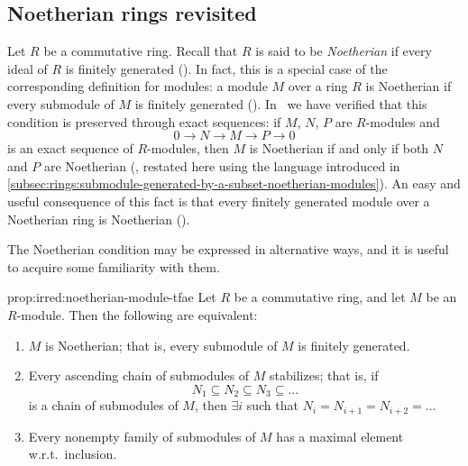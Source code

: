 \subsection{Noetherian rings revisited}
\label{subsec:irred:noetherian-rings-revisited}

Let $R$ be a commutative ring. Recall that $R$ is said to be
\emph{Noetherian} if every ideal of $R$ is finitely generated
(). In fact, this is a special case of the
corresponding definition for modules: a module $M$ over a ring $R$ is
Noetherian if every submodule of $M$ is finitely generated
(). In~
we have verified that this condition is preserved through exact
sequences: if $M$, $N$, $P$ are $R$-modules and
\[0 \longrightarrow N \longrightarrow M \longrightarrow P
  \longrightarrow 0\] is an exact sequence of $R$-modules, then $M$ is
Noetherian if and only if both $N$ and $P$ are Noetherian
(, restated here using the
language introduced in
\cref{subsec:rings:submodule-generated-by-a-subset-noetherian-modules}).
An easy and useful
consequence of this fact is that every finitely generated module over
a Noetherian ring is Noetherian
().

The Noetherian condition may be expressed in alternative ways, and it
is useful to acquire some familiarity with them.
\begin{prop}{}{prop:irred:noetherian-module-tfae}
  Let $R$ be a commutative ring, and let $M$ be an $R$-module. Then
  the following are equivalent:
  \begin{enumerate}[label=(\arabic*)]
  \item $M$ is Noetherian; that is, every submodule of $M$ is finitely
    generated.
  \item Every ascending chain of submodules of $M$ stabilizes; that
    is, if
    \[N_1 \subseteq N_2 \subseteq N_3 \subseteq \dots\] is a chain of
    submodules of $M$, then $\exists i$ such that
    $N_i = N_{i+1} = N_{i+2} = \dots$
  \item Every nonempty family of submodules of $M$ has a maximal
    element w.r.t.\ inclusion.
  \end{enumerate}
\end{prop}

